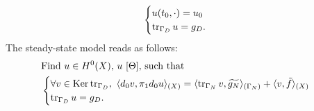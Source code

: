 \begin{discussion}
\begin{equation}
\begin{split}
\begin{cases}
        u(t_0, \cdot) = u_0 \\
        \mathop{\rm tr}\nolimits_{\Gamma_D} u = g_D.
      \end{cases}
    \end{split}
  \end{equation}
  The steady-state model reads as follows:
  \begin{equation}
    \begin{split}
      & \text{Find $u \in H^0(X)$, $u\ [\Theta]$, such that} \\
      &
      \begin{cases}
        \forall v \in \mathop{\rm Ker}\nolimits \mathop{\rm tr}\nolimits_{\Gamma_D},\
          \langle d_0 v,\pi_1 d_0 u\rangle_{(X)}
          = \langle\mathop{\rm tr}\nolimits_{\Gamma_N} v,\widetilde{g_N}\rangle_{(\Gamma_N)}
          + \langle v,\tilde{f}\rangle_{(X)} \\
        \mathop{\rm tr}\nolimits_{\Gamma_D} u = g_D.
      \end{cases}
    \end{split}
  \end{equation}
\end{discussion}
